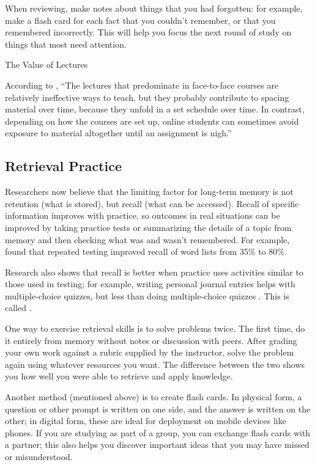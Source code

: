 When reviewing, make notes about things that you had forgotten: for
example, make a flash card for each fact that you couldn't remember,
or that you remembered incorrectly.  This will help you focus the next
round of study on things that most need attention.

\begin{callout}{The Value of Lectures}

  According to \cite{Mill2016a}, ``The lectures that predominate in
  face-to-face courses are relatively ineffective ways to teach, but
  they probably contribute to spacing material over time, because they
  unfold in a set schedule over time. In contrast, depending on how
  the courses are set up, online students can sometimes avoid exposure
  to material altogether until an assignment is nigh.''

\end{callout}

\subsection*{Retrieval Practice}

Researchers now believe that the limiting factor for long-term memory
is not retention (what is stored), but recall (what can be accessed).
Recall of specific information improves with practice, so outcomes in
real situations can be improved by taking practice tests or
summarizing the details of a topic from memory and then checking what
was and wasn't remembered.  For example, \cite{Karp2008} found that
repeated testing improved recall of word lists from 35\% to 80\%.

Research also shows that recall is better when practice uses
activities similar to those used in testing; for example, writing
personal journal entries helps with multiple-choice quizzes, but less
than doing multiple-choice quizzes \cite{Mill2016a}.  This is called
.

One way to exercise retrieval skills is to solve problems twice.  The
first time, do it entirely from memory without notes or discussion
with peers.  After grading your own work against a rubric supplied by
the instructor, solve the problem again using whatever resources you
want.  The difference between the two shows you how well you were able
to retrieve and apply knowledge.

Another method (mentioned above) is to create flash cards.  In
physical form, a question or other prompt is written on one side, and
the answer is written on the other; in digital form, these are ideal
for deployment on mobile devices like phones.  If you are studying as
part of a group, you can exchange flash cards with a partner; this
also helps you discover important ideas that you may have missed or
misunderstood.

